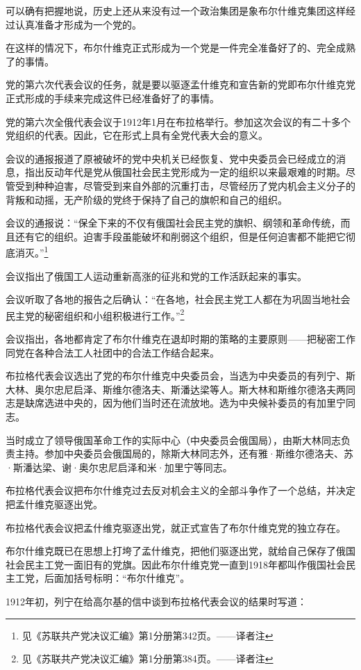 可以确有把握地说，历史上还从来没有过一个政治集团是象布尔什维克集团这样经过认真准备才形成为一个党的。

在这样的情况下，布尔什维克正式形成为一个党是一件完全准备好了的、完全成熟了的事情。

党的第六次代表会议的任务，就是要以驱逐孟什维克和宣告新的党即布尔什维克党正式形成的手续来完成这件已经准备好了的事情。

党的第六次全俄代表会议于1912年1月在布拉格举行。参加这次会议的有二十多个党组织的代表。因此，它在形式上具有全党代表大会的意义。

会议的通报报道了原被破坏的党中央机关已经恢复、党中央委员会已经成立的消息，指出反动年代是党从俄国社会民主党形成为一定的组织以来最艰难的时期。尽管受到种种迫害，尽管受到来自外部的沉重打击，尽管经历了党内机会主义分子的背叛和动摇，无产阶级的党终于保持了自己的旗帜和自己的组织。

会议的通报说：“保全下来的不仅有俄国社会民主党的旗帜、纲领和革命传统，而且还有它的组织。迫害手段虽能破坏和削弱这个组织，但是任何迫害都不能把它彻底消灭。”\footnote{见《苏联共产党决议汇编》第1分册第342页。——译者注}

会议指出了俄国工人运动重新高涨的征兆和党的工作活跃起来的事实。

会议听取了各地的报告之后确认：“在各地，社会民主党工人都在为巩固当地社会民主党的秘密组织和小组积极进行工作。”\footnote{见《苏联共产党决议汇编》第1分册第384页。——译者注}

会议指出，各地都肯定了布尔什维克在退却时期的策略的主要原则——把秘密工作同党在各种合法工人社团中的合法工作结合起来。

布拉格代表会议选出了党的布尔什维克中央委员会，当选为中央委员的有列宁、斯大林、奥尔忠尼启泽、斯维尔德洛夫、斯潘达梁等人。斯大林和斯维尔德洛夫两同志是缺席选进中央的，因为他们当时还在流放地。选为中央候补委员的有加里宁同志。

当时成立了领导俄国革命工作的实际中心（中央委员会俄国局），由斯大林同志负责主持。参加中央委员会俄国局的，除斯大林同志外，还有雅·斯维尔德洛夫、苏·斯潘达梁、谢·奥尔忠尼启泽和米·加里宁等同志。

布拉格代表会议把布尔什维克过去反对机会主义的全部斗争作了一个总结，并决定把孟什维克驱逐出党。

布拉格代表会议把孟什维克驱逐出党，就正式宣告了布尔什维克党的独立存在。

布尔什维克既已在思想上打垮了孟什维克，把他们驱逐出党，就给自己保存了俄国社会民主工党一面旧有的党旗。因此布尔什维克党一直到1918年都叫作俄国社会民主工党，后面加括号标明：“布尔什维克”。

1912年初，列宁在给高尔基的信中谈到布拉格代表会议的结果时写道：

